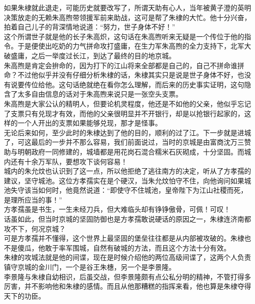 \begin{multicols}{\theparacolNo}
如果朱棣就此退走，可能历史就要改写了，所谓天助有心人，当年被黄子澄的英明决策放走的无赖朱高煦带领援军前来助战，这可是帮了朱棣的大忙。他十分兴奋，拍着自己儿子的背深情地说道：“努力，世子身体不好！”\\

这个所谓世子就是他的长子朱高炽，这句话在朱高煦听来无疑是一个传位于他的指令。于是便使出吃奶的力气拼命攻打盛庸，在生力军朱高煦的全力支持下，北军大破盛庸，之后一举度过长江，到达了最终的目的地京城。\\

朱高煦是肯定会拚命的，因为打下的江山将来全部都是自己的，自己不拼命谁拼命？不过他似乎并没有仔细分析朱棣的话，朱棣其实只是说是世子身体不好，也没有说要传位给他。这句话绝就绝在看你怎么理解，而后来的历史事实证明，这句隐含了太多自由信息的话对于朱高煦来说只是一张空头支票。\\

朱高煦是大家公认的精明人，但要论机灵程度，他还是不如他的父亲，他似乎忘记了支票只有兑现才有效，而他的父亲很明显并不开银行，却是以抢银行起家的，这样的一个人开出的支票如果能够兑现，那才是怪事。\\

无论后来如何，至少此时的朱棣达到了他的目的，顺利的过了江。下一步就是进城了，可这最后的一步并不那么容易，我们前面说过，当时的京城是由富商沈万三赞助与明朝政府一同修建的，城墙都是用花岗石混合糯米石灰砌成，十分坚固。而城内还有十余万军队，要想攻下谈何容易！\\

城内的朱允炆也认识到了这一点，所以他拒绝了逃往南方的决定，听从了方孝孺的建议，坚守城池。这位方孝孺实在是个硬汉，当朱允炆怕守不住，向他询问如果城池失守该当如何时，他竟然说道：“即使守不住城池，皇帝陛下为江山社稷而死，是理所应当的事！”\\

方孝孺虽是书生，一生未经刀兵，但大难临头却有铮铮傲骨，可佩！可叹！\\

话虽如此，但当时京城的坚固防御也是方孝孺敢说硬话的原因之一，朱棣连济南都攻不下，何况京城？\\

可是方孝孺并不懂得，这个世界上最坚固的堡垒往往都是从内部被攻破的。朱棣也不是傻瓜，他敢于率军围城，自然有破城的方法，而且这个方法十分有效。\\

朱棣的攻城法就是他的间谍，现在是时候介绍他的两位高级间谍了，这两个人负责镇守京城的金川门，一个是谷王朱橞，另一个是李景隆。\\

李景隆与朱棣自幼相识，后虽交战，但李景隆颇有点公私分明的精神，不管打得多厉害，并不影响他和朱棣的感情。而且从他那糟糕的指挥来看，他也算是朱棣夺得天下的功臣。\\


\end{multicols}
